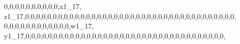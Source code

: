 \documentclass[]{article}
\newenvironment{Shaded}{\begin{snugshade}}{\end{snugshade}}
\newcommand{\DecValTok}[1]{\textcolor[rgb]{0.00,0.00,0.81}{#1}}
\newcommand{\NormalTok}[1]{#1}
\begin{document}
\begin{Shaded}
\begin{Highlighting}[]
\DecValTok{0}\NormalTok{,}\DecValTok{0}\NormalTok{,}\DecValTok{0}\NormalTok{,}\DecValTok{0}\NormalTok{,}\DecValTok{0}\NormalTok{,}\DecValTok{0}\NormalTok{,}\DecValTok{0}\NormalTok{,}\DecValTok{0}\NormalTok{,}\DecValTok{0}\NormalTok{,}\DecValTok{0}\NormalTok{,x1_}\DecValTok{17}\NormalTok{, z1_}\DecValTok{17}\NormalTok{,}\DecValTok{0}\NormalTok{,}\DecValTok{0}\NormalTok{,}\DecValTok{0}\NormalTok{,}\DecValTok{0}\NormalTok{,}\DecValTok{0}\NormalTok{,}\DecValTok{0}\NormalTok{,}\DecValTok{0}\NormalTok{,}\DecValTok{0}\NormalTok{,}\DecValTok{0}\NormalTok{,}\DecValTok{0}\NormalTok{,}\DecValTok{0}\NormalTok{,}\DecValTok{0}\NormalTok{,}\DecValTok{0}\NormalTok{,}\DecValTok{0}\NormalTok{,}\DecValTok{0}\NormalTok{,}\DecValTok{0}\NormalTok{,}\DecValTok{0}\NormalTok{,}\DecValTok{0}\NormalTok{,}\DecValTok{0}\NormalTok{,}\DecValTok{0}\NormalTok{,}\DecValTok{0}\NormalTok{,}\DecValTok{0}\NormalTok{,}\DecValTok{0}\NormalTok{,}\DecValTok{0}\NormalTok{,}\DecValTok{0}\NormalTok{,}\DecValTok{0}\NormalTok{,}\DecValTok{0}\NormalTok{,}\DecValTok{0}\NormalTok{,}\DecValTok{0}\NormalTok{,}\DecValTok{0}\NormalTok{,}\DecValTok{0}\NormalTok{,}\DecValTok{0}\NormalTok{,}\DecValTok{0}\NormalTok{,}\DecValTok{0}\NormalTok{,}\DecValTok{0}\NormalTok{,}\DecValTok{0}\NormalTok{,}\DecValTok{0}\NormalTok{,}\DecValTok{0}\NormalTok{,}
\DecValTok{0}\NormalTok{,}\DecValTok{0}\NormalTok{,}\DecValTok{0}\NormalTok{,}\DecValTok{0}\NormalTok{,}\DecValTok{0}\NormalTok{,}\DecValTok{0}\NormalTok{,}\DecValTok{0}\NormalTok{,}\DecValTok{0}\NormalTok{,}\DecValTok{0}\NormalTok{,}\DecValTok{0}\NormalTok{,}\DecValTok{0}\NormalTok{,}\DecValTok{0}\NormalTok{,w1_}\DecValTok{17}\NormalTok{, y1_}\DecValTok{17}\NormalTok{,}\DecValTok{0}\NormalTok{,}\DecValTok{0}\NormalTok{,}\DecValTok{0}\NormalTok{,}\DecValTok{0}\NormalTok{,}\DecValTok{0}\NormalTok{,}\DecValTok{0}\NormalTok{,}\DecValTok{0}\NormalTok{,}\DecValTok{0}\NormalTok{,}\DecValTok{0}\NormalTok{,}\DecValTok{0}\NormalTok{,}\DecValTok{0}\NormalTok{,}\DecValTok{0}\NormalTok{,}\DecValTok{0}\NormalTok{,}\DecValTok{0}\NormalTok{,}\DecValTok{0}\NormalTok{,}\DecValTok{0}\NormalTok{,}\DecValTok{0}\NormalTok{,}\DecValTok{0}\NormalTok{,}\DecValTok{0}\NormalTok{,}\DecValTok{0}\NormalTok{,}\DecValTok{0}\NormalTok{,}\DecValTok{0}\NormalTok{,}\DecValTok{0}\NormalTok{,}\DecValTok{0}\NormalTok{,}\DecValTok{0}\NormalTok{,}\DecValTok{0}\NormalTok{,}\DecValTok{0}\NormalTok{,}\DecValTok{0}\NormalTok{,}\DecValTok{0}\NormalTok{,}\DecValTok{0}\NormalTok{,}\DecValTok{0}\NormalTok{,}\DecValTok{0}\NormalTok{,}\DecValTok{0}\NormalTok{,}\DecValTok{0}\NormalTok{,}\DecValTok{0}\NormalTok{,}\DecValTok{0}\NormalTok{,}

\end{Highlighting}
\end{Shaded}
\end{document}
